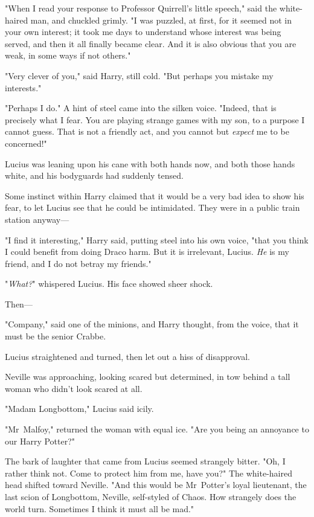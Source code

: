 "When I read your response to Professor Quirrell’s little speech," said the
white-haired man, and chuckled grimly. "I was puzzled, at first, for it seemed
not in your own interest; it took me days to understand whose interest was
being served, and then it all finally became clear. And it is also obvious that
you are weak, in some ways if not others."

"Very clever of you," said Harry, still cold. "But perhaps you mistake my
interests."

"Perhaps I do." A hint of steel came into the silken voice. "Indeed, that is
precisely what I fear. You are playing strange games with my son, to a purpose
I cannot guess. That is not a friendly act, and you cannot but \emph{expect} me
to be concerned!"

Lucius was leaning upon his cane with both hands now, and both those hands
white, and his bodyguards had suddenly tensed.

Some instinct within Harry claimed that it would be a very bad idea to show his
fear, to let Lucius see that he could be intimidated. They were in a public
train station anyway—

"I find it interesting," Harry said, putting steel into his own voice, "that
you think I could benefit from doing Draco harm. But it is irrelevant, Lucius.
\emph{He} is my friend, and I do not betray my friends."

"\emph{What?}" whispered Lucius. His face showed sheer shock.

Then—

"Company," said one of the minions, and Harry thought, from the voice, that it
must be the senior Crabbe.

Lucius straightened and turned, then let out a hiss of disapproval.

Neville was approaching, looking scared but determined, in tow behind a tall
woman who didn’t look scared at all.

"Madam Longbottom," Lucius said icily.

"Mr~Malfoy," returned the woman with equal ice. "Are you being an annoyance to
our Harry Potter?"

The bark of laughter that came from Lucius seemed strangely bitter. "Oh, I
rather think not. Come to protect him from me, have you?" The white-haired head
shifted toward Neville. "And this would be Mr~Potter’s loyal lieutenant, the
last scion of Longbottom, Neville, self-styled of Chaos. How strangely does the
world turn. Sometimes I think it must all be mad."

